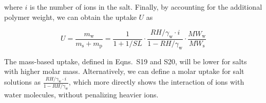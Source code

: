 \documentclass[11pt]{article}
\begin{document}
where $i$ is the number of ions in the salt. Finally, by accounting for the additional polymer weight, we can obtain the uptake $U$ as

\begin{equation}
U = \frac{m_\mathrm{w}}{m_\mathrm{s}+m_\mathrm{p}} = \frac{1}{1 + 1/SL}\cdot \frac{RH/\gamma_\mathrm{w}\cdot i}{1-RH/\gamma_\mathrm{w}}\cdot \frac{MW_\mathrm{w}}{MW_\mathrm{s}} \tag{S20}
\end{equation}

The mass-based uptake, defined in Eqns.~S19 and S20, will be lower for salts with higher molar mass. Alternatively, we can define a molar uptake for salt solutions as $\frac{RH/\gamma_\mathrm{w}\cdot i}{1-RH/\gamma_\mathrm{w}}$, which more directly shows the interaction of ions with water molecules, without penalizing heavier ions.

\clearpage
\end{document}

